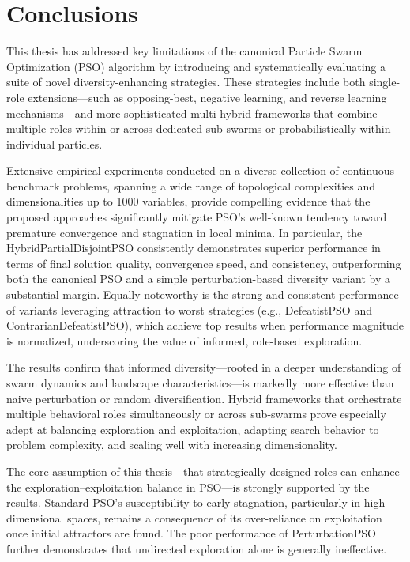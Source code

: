 \chapter[Conclusions]{Conclusions}
\label{cp:conclusions}


This thesis has addressed key limitations of the canonical Particle Swarm Optimization (PSO) algorithm by introducing and systematically evaluating a suite of novel diversity-enhancing strategies. These strategies include both single-role extensions---such as opposing-best, negative learning, and reverse learning mechanisms---and more sophisticated multi-hybrid frameworks that combine multiple roles within or across dedicated sub-swarms or probabilistically within individual particles.

Extensive empirical experiments conducted on a diverse collection of continuous benchmark problems, spanning a wide range of topological complexities and dimensionalities up to 1000 variables, provide compelling evidence that the proposed approaches significantly mitigate PSO’s well-known tendency toward premature convergence and stagnation in local minima. In particular, the HybridPartialDisjointPSO consistently demonstrates superior performance in terms of final solution quality, convergence speed, and consistency, outperforming both the canonical PSO and a simple perturbation-based diversity variant by a substantial margin. Equally noteworthy is the strong and consistent performance of variants leveraging attraction to worst strategies (e.g., DefeatistPSO and ContrarianDefeatistPSO), which achieve top results when performance magnitude is normalized, underscoring the value of informed, role-based exploration.

The results confirm that informed diversity---rooted in a deeper understanding of swarm dynamics and landscape characteristics---is markedly more effective than naive perturbation or random diversification. Hybrid frameworks that orchestrate multiple behavioral roles simultaneously or across sub-swarms prove especially adept at balancing exploration and exploitation, adapting search behavior to problem complexity, and scaling well with increasing dimensionality.

The core assumption of this thesis---that strategically designed roles can enhance the exploration–exploitation balance in PSO---is strongly supported by the results. Standard PSO’s susceptibility to early stagnation, particularly in high-dimensional spaces, remains a consequence of its over-reliance on exploitation once initial attractors are found. The poor performance of PerturbationPSO further demonstrates that undirected exploration alone is generally ineffective.

